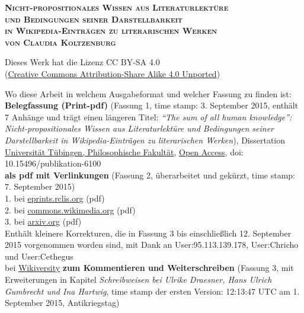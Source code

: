\documentclass[fontsize=12pt]{scrartcl}
\begin{document}
\begin{titlepage}

\begin{center}
\vspace*{0,2cm} 
\textsc{\large\textbf{Nicht-propositionales Wissen aus Literaturlekt\"ure\\ und Bedingungen seiner Darstellbarkeit\\ in Wikipedia-Eintr\"agen zu literarischen Werken}}\\
\vspace{1cm}
\textsc{\large\textbf{von Claudia Koltzenburg}}

\vspace{1cm}
Dieses Werk hat die Lizenz CC BY-SA 4.0\\ (\href{https://creativecommons.org/licenses/by-sa/4.0/}{Creative Commons Attribution-Share Alike 4.0 Unported})
\end{center}

\vspace{1cm}
Wo diese Arbeit in welchem Ausgabeformat und welcher Fassung zu finden ist:\\
\newline
\textbf{Belegfassung (Print-pdf)} (Fassung 1, time stamp: 3. September 2015, enth\"alt 7 Anh\"ange und tr\"agt einen l\"angeren Titel: \textit{"`The sum of all human knowledge"': Nicht-propositionales Wissen aus Literaturlekt\"ure und Bedingungen seiner Darstellbarkeit in Wikipedia-Eintr\"agen zu literarischen Werken}), Dissertation \href{http://hdl.handle.net/10900/64678}{Universit\"at T\"ubingen, Philo\-so\-phi\-sche Fakult\"at}, \href{https://de.wikipedia.org/wiki/Open_Access}{Open Access}, doi: 10.15496/publikation-6100\\
\newline
\textbf{als pdf mit Verlinkungen} (Fassung 2, \"uberarbeitet und gek\"urzt, time stamp: 7. September 2015)\\
1. bei \href{http://hdl.handle.net/10760/25717}{eprints.rclis.org} (pdf)\\
2. bei \href{https://commons.wikimedia.org/wiki/File:Koltzenburg_Sept2015_Nicht-propositionales-Wissen_Literarische-Werke_Wikipedia.pdf}{commons.wikimedia.org} (pdf)\\
3. bei \href{https://arxiv.org}{arxiv.org} (pdf)\\
Enth\"alt kleinere Korrekturen, die in Fassung 3 bis einschlie{\ss}lich 12. September 2015 vorgenommen worden sind, mit Dank an User:95.113.139.178, User:Chricho und User:Cethegus\\
\newline
bei \href{https://de.wikiversity.org/wiki/Nicht-propositionales_Wissen_aus_Literaturlektüre_und_Bedingungen_seiner_Darstellbarkeit_in_Wikipedia-Einträgen_zu_literarischen_Werken}{Wikiversity} \textbf{zum Kommentieren und Weiterschreiben} (Fassung 3, mit Erweiterungen in Kapitel \textit{Schreibweisen bei Ulrike Draesner, Hans Ulrich Gumbrecht und Ina Hartwig}, time stamp der ersten Version: 12:13:47‎ UTC am 1. September 2015, Antikriegstag)


\end{titlepage}
\end{document}

